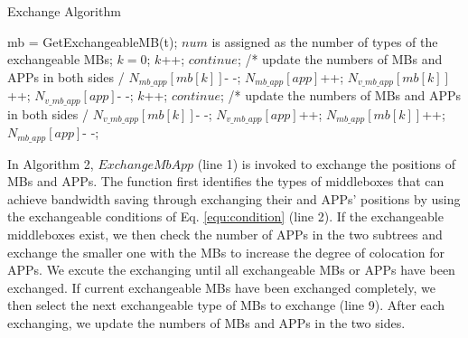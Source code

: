 \documentclass[review]{elsarticle}
\begin{document}

\begin{algorithm}[H]
	\caption{Exchange Algorithm}
	\begin{algorithmic}[1]
		\State mb = GetExchangeableMB(t);
		\State $num$ is assigned as the number of types
		\State of the exchangeable MBs;
		\State $k = 0$;
		\State $k$++; $continue$;
		\EndIf
		\State /* update the numbers of MBs
		\State and APPs in both sides \quad \quad*/
		\State $N_{mb\_app}[mb[k]]$- -; $N_{mb\_app}[app]$++;
		\State $N_{v\_mb\_app}[mb[k]]$++; $N_{v\_mb\_app}[app]$- -;
		\EndWhile
		\Else
		\While{$k<num \quad and \quad N_{mb\_app}!=0$}
		\If {$N_{v\_mb\_app}[mb[k]]==0$}
		\State $k$++; $continue$;
		\EndIf
		\State /* update the numbers of MBs
		\State and APPs in both sides \quad \quad*/
		\State $N_{v\_mb\_app}[mb[k]]$- -; $N_{v\_mb\_app}[app]$++;
		\State $N_{mb\_app}[mb[k]]$++; $N_{mb\_app}[app]$- -;
		\EndWhile
		\EndIf
		\EndIf
		\EndFunction    
	\end{algorithmic}
	
\end{algorithm}		

In Algorithm 2, $ExchangeMbApp$ (line 1) is invoked to exchange the positions of MBs and APPs. The function first identifies the types of middleboxes that can achieve bandwidth saving through exchanging their and APPs' positions by using the exchangeable conditions of Eq. \ref{equ:condition} (line 2). If the exchangeable middleboxes exist, we then check the number of APPs in the two subtrees and exchange the smaller one with the MBs to increase the degree of colocation for APPs. We excute the exchanging until all exchangeable MBs or APPs have been exchanged. If current exchangeable MBs have been exchanged completely, we then select the next exchangeable type of MBs to exchange (line 9). After each exchanging, we update the numbers of MBs and APPs in the two sides.

\end{document}
